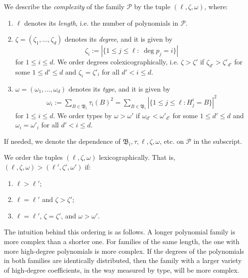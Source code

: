 \documentclass[11pt]{amsart}
\theoremstyle{definition}
\newcommand{\CP}{{\mathcal P}}
\newcommand{\FB}{{\mathfrak B}}
\newcommand{\1}{{\mathbf{1}}}
\newcommand{\abs}[1]{\mathopen{}\left| #1\mathclose{}\right|}
\begin{document}
We describe the \textit{complexity} of the family $\CP$ by the tuple $(\ell, \zeta, \omega)$, where: 
\begin{enumerate}
    \item $\ell$ denotes its \textit{length}, i.e. the number of polynomials in $\mathcal{P}$.
    \item $\zeta = (\zeta_1, \ldots, \zeta_d)$ denotes its \textit{degree}, and it is given by 
    $$\zeta_i :=|\{1\leq j\leq \ell:\; \deg p_j = i\}|$$ 
    for $1\leq i\leq d$. We order degrees colexicographically, i.e. $\zeta>\zeta'$ if $\zeta_{d'}>\zeta'_{d'}$ for some $1\leq d'\leq d$ and $\zeta_i = \zeta'_i$ for all $d'<i\leq d$. 
    \item $\omega = (\omega_1, \ldots, \omega_d)$ denotes its \textit{type}, and it is given by 
    \begin{align*}
    \omega_i:=\sum_{B\in \FB_i} \tau_{i}(B)^2 = \sum_{B\in \FB_i}\abs{\{1\leq j\leq \ell\colon H_{j}^{i}=B\}}^2
\end{align*}
for $1\leq i\leq d$.
We order types by $\omega>\omega'$ if $\omega_{d'}<\omega'_{d'}$ for some $1\leq d'\leq d$ and $\omega_i = \omega'_i$ for all $d'<i\leq d$.
\end{enumerate}
If needed, we denote the dependence of $\FB_i, \tau, \ell, \zeta, \omega$, etc. on $\CP$ in the subscript. 

We order the tuples $(\ell, \zeta, \omega)$ lexicographically. That is, $(\ell, \zeta, \omega)>(\ell', \zeta', \omega')$ if:
\begin{enumerate}
    \item $\ell > \ell'$;
    \item $\ell = \ell'$ and $\zeta > \zeta'$;
    \item $\ell = \ell'$, $\zeta = \zeta'$, and $\omega > \omega'$.
\end{enumerate}
The intuition behind this ordering is as follows. A longer polynomial family is more complex than a shorter one. For families of the same length, the one with more high-degree polynomials is more complex. If the degrees of the polynomials in both families are identically distributed, then the family with a larger variety of high-degree coefficients, in the way measured by type, will be more complex.
\end{document}
